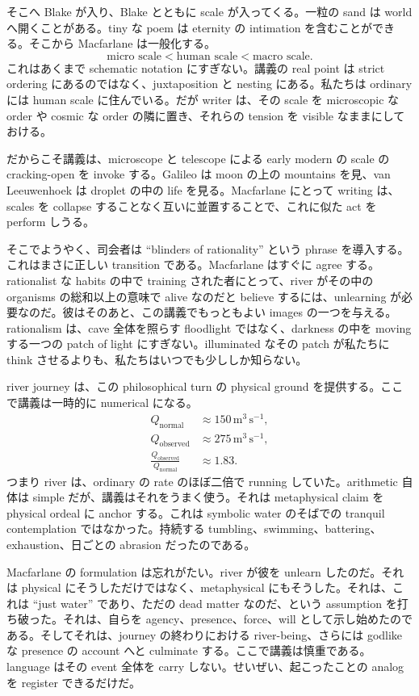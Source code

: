 そこへ Blake が入り、Blake とともに scale が入ってくる。一粒の sand は world へ開くことがある。tiny な poem は eternity の intimation を含むことができる。そこから Macfarlane は一般化する。
\begin{equation}
\text{micro scale} < \text{human scale} < \text{macro scale}.
\end{equation}
これはあくまで schematic notation にすぎない。講義の real point は strict ordering にあるのではなく、juxtaposition と nesting にある。私たちは ordinary には human scale に住んでいる。だが writer は、その scale を microscopic な order や cosmic な order の隣に置き、それらの tension を visible なままにしておける。

だからこそ講義は、microscope と telescope による early modern の scale の cracking-open を invoke する。Galileo は moon の上の mountains を見、van Leeuwenhoek は droplet の中の life を見る。Macfarlane にとって writing は、scales を collapse することなく互いに並置することで、これに似た act を perform しうる。

そこでようやく、司会者は ``blinders of rationality'' という phrase を導入する。これはまさに正しい transition である。Macfarlane はすぐに agree する。rationalist な habits の中で training された者にとって、river がその中の organisms の総和以上の意味で alive なのだと believe するには、unlearning が必要なのだ。彼はそのあと、この講義でもっともよい images の一つを与える。rationalism は、cave 全体を照らす floodlight ではなく、darkness の中を moving する一つの patch of light にすぎない。illuminated なその patch が私たちに think させるよりも、私たちはいつでも少ししか知らない。

river journey は、この philosophical turn の physical ground を提供する。ここで講義は一時的に numerical になる。
\begin{align}
Q_{\text{normal}} &\approx 150\,\mathrm{m^3\,s^{-1}},\\
Q_{\text{observed}} &\approx 275\,\mathrm{m^3\,s^{-1}},\\
\frac{Q_{\text{observed}}}{Q_{\text{normal}}} &\approx 1.83.
\end{align}
つまり river は、ordinary の rate のほぼ二倍で running していた。arithmetic 自体は simple だが、講義はそれをうまく使う。それは metaphysical claim を physical ordeal に anchor する。これは symbolic water のそばでの tranquil contemplation ではなかった。持続する tumbling、swimming、battering、exhaustion、日ごとの abrasion だったのである。

Macfarlane の formulation は忘れがたい。river が彼を unlearn したのだ。それは physical にそうしただけではなく、metaphysical にもそうした。それは、これは ``just water'' であり、ただの dead matter なのだ、という assumption を打ち破った。それは、自らを agency、presence、force、will として示し始めたのである。そしてそれは、journey の終わりにおける river-being、さらには godlike な presence の account へと culminate する。ここで講義は慎重である。language はその event 全体を carry しない。せいぜい、起こったことの analog を register できるだけだ。

